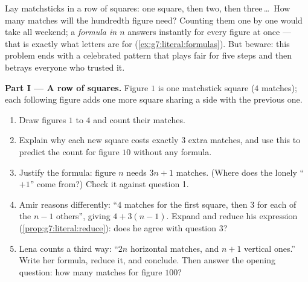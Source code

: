 \begin{problem}
\label{pb:g7:literal:1}
Lay matchsticks in a row of squares: one square, then two, then
three\,\dots\ How many matches will the hundredth figure need?
Counting them one by one would take all weekend; a \emph{formula
in $n$} answers instantly for every figure at once --- that is
exactly what letters are for
(\cref{ex:g7:literal:formulas}). But beware: this problem ends
with a celebrated pattern that plays fair for five steps and then
betrays everyone who trusted it.

\medskip
\noindent\textbf{Part I --- A row of squares.}
Figure $1$ is one matchstick square ($4$ matches); each following
figure adds one more square sharing a side with the previous one.
\begin{enumerate}
  \item Draw figures $1$ to $4$ and count their matches.
  \item Explain why each new square costs exactly $3$ extra
        matches, and use this to predict the count for figure
        $10$ without any formula.
  \item Justify the formula: figure $n$ needs $3n + 1$ matches.
        (Where does the lonely ``$+1$'' come from?) Check it
        against question 1.
  \item Amir reasons differently: ``$4$ matches for the first
        square, then $3$ for each of the $n - 1$ others'', giving
        $4 + 3(n - 1)$. Expand and reduce his expression
        (\cref{prop:g7:literal:reduce}): does he agree with
        question 3?
  \item Lena counts a third way: ``$2n$ horizontal matches, and
        $n + 1$ vertical ones.'' Write her formula, reduce it,
        and conclude. Then answer the opening question: how many
        matches for figure $100$?
\end{enumerate}


\end{problem}
